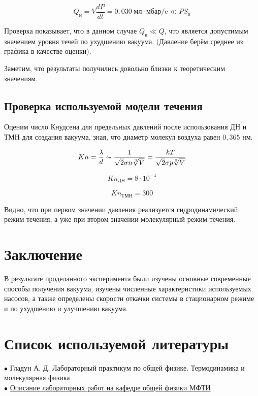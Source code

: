 \documentclass[a4paper, 12pt]{article} %
\begin{document}
\begin{equation}
    Q_{\text{н}} = V \frac{dP}{dt} = 0,030 \; \text{мл} \cdot \text{мбар/c} \ll P S_{\text{о}}
\end{equation}

Проверка показывает, что в данном случае $Q_{\text{н}} \ll Q$, что является допустимым значением уровня течей по ухудшению вакуума. (Давление берём среднее из графика в качестве оценки).

Заметим, что результаты получились довольно близки к теоретическим значениям.

\subsection{Проверка используемой модели течения}

Оценим число Кнудсена для предельных давлений после использования ДН и ТМН для создания вакуума, зная, что диаметр молекул воздуха равен $0,365$ нм.

\begin{equation}
    Kn = \frac{\lambda}{d} \thicksim \frac{1}{\sqrt{2} \sigma n \sqrt[3]{V}} = \frac{kT}{\sqrt{2} \sigma p \sqrt[3]{V}}
\end{equation}

\begin{equation}
    Kn_{\text{ДН}} = 8 \cdot 10^{-4}
\end{equation}

\begin{equation}
    Kn_{\text{ТМН}} = 300
\end{equation}

Видно, что при первом значении давления реализуется гидродинамический режим течения, а уже при втором значении молекулярный режим течения.

\section{Заключение}

В результате проделанного эксперимента были изучены основные современные способы получения вакуума, изучены численные характеристики используемых насосов, а также определены скорости откачки системы в стационарном режиме и по ухудшению и улучшению вакуума.


\section{Список используемой литературы}

$\bullet$ Гладун А. Д. Лабораторный практикум по общей физике. Термодинамика и молекулярная физика\\

$\bullet$ \href{https://mipt.ru/education/chair/physics/S_II/lab/}{Описание лабораторных работ на кафедре общей физики МФТИ}






 
\end{document}
